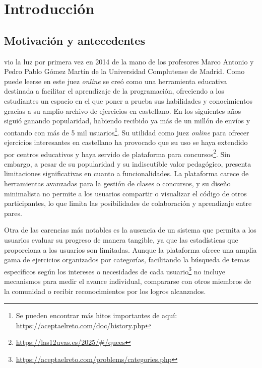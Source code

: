 \chapter{Introducción}
\label{cap:introduccion}

\section{Motivación y antecedentes} 

\aer vio la luz por primera vez en 2014 de la mano de los profesores Marco Antonio y Pedro Pablo Gómez Martín de la Universidad Complutense de Madrid. Como puede leerse en \cite{Pedro_Pablo_Gomez_Martin_Marco_Antonio_Gomez_Martin_2017} este juez \textit{online} se creó como una herramienta educativa destinada a facilitar el aprendizaje de la programación, ofreciendo a los estudiantes un espacio en el que poner a prueba sus habilidades y conocimientos gracias a su amplio archivo de ejercicios en castellano. En los siguientes años siguió ganando popularidad, habiendo recibido ya más de un millón de envíos y contando con más de 5 mil usuarios\footnote{Se pueden encontrar más hitos importantes de \aer aquí: \url{https://aceptaelreto.com/doc/history.php}}. Su utilidad como juez \textit{online} para ofrecer ejercicios interesantes en castellano ha provocado que su uso se haya extendido por centros educativos y haya servido de plataforma para concursos\footnote{\url{https://las12uvas.es/2025/\#/quees}}. Sin embargo, a pesar de su popularidad y su indiscutible valor pedagógico, \aer presenta limitaciones significativas en cuanto a funcionalidades. La plataforma carece de herramientas avanzadas para la gestión de clases o concursos, y su diseño minimalista no permite a los usuarios compartir o visualizar el código de otros participantes, lo que limita las posibilidades de colaboración y aprendizaje entre pares.

Otra de las carencias más notables es la ausencia de un sistema que permita a los usuarios evaluar su progreso de manera tangible, ya que las estadísticas que proporciona a los usuarios son limitadas. Aunque la plataforma ofrece una amplia gama de ejercicios organizados por categorías, facilitando la búsqueda de temas específicos según los intereses o necesidades de cada usuario\footnote{\url{https://aceptaelreto.com/problems/categories.php}} no incluye mecanismos para medir el avance individual, compararse con otros miembros de la comunidad o recibir reconocimientos por los logros alcanzados. 


